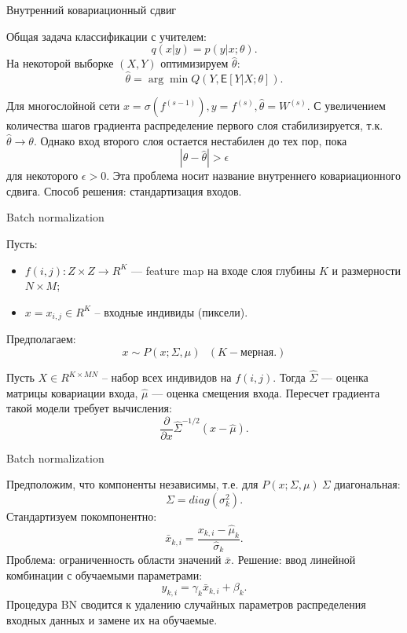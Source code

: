 \documentclass[11pt, intlimits]{beamer}
\newcommand{\Expect}{\mathsf{E}}
\begin{document}
\begin{frame}{Внутренний ковариационный сдвиг}

Общая задача классификации с учителем:
$$
q(x|y)=p(y|x; \theta).
$$
На некоторой выборке $(X, Y)$ оптимизируем $\hat{\theta}$:
$$
\hat{\theta}=\arg \min Q(Y, \Expect[Y|X; \theta]).
$$

Для многослойной сети $x=\sigma(f^{(s-1)}), y=f^{(s)}, \hat{\theta}=W^{(s)}$. С увеличением количества шагов градиента распределение первого слоя стабилизируется, т.к. $\hat{\theta} \to \theta$. Однако вход второго слоя остается нестабилен до тех пор, пока 
$$
|\theta - \hat{\theta}|>\epsilon
$$
для некоторого $\epsilon > 0$. Эта проблема носит название внутреннего ковариационного сдвига. Способ решения: стандартизация входов.

\end{frame}

\begin{frame}{Batch normalization}

Пусть:
\begin{itemize}
\item $f(i,j) : Z \times Z \to R^K$ --- feature map на входе слоя глубины $K$ и размерности $N \times M$;
\item $x=x_{i,j} \in R^{K}$ -- входные индивиды (пиксели).
\end{itemize}

Предполагаем:
$$
x \sim P(x; \Sigma, \mu) \ \ \ (K-\text{мерная.})
$$

Пусть $X \in R^{K \times MN}$ -- набор всех индивидов на $f(i, j)$. Тогда $\hat{\Sigma}$ --- оценка матрицы ковариации входа, $\hat{\mu}$ --- оценка смещения входа. Пересчет градиента такой модели требует вычисления:
$$
\frac{\partial}{\partial x} \hat{\Sigma}^{-1/2}(x-\hat{\mu}).
$$

\end{frame}

\begin{frame}{Batch normalization}

Предположим, что компоненты независимы, т.е. для $P(x; \Sigma, \mu) \ \Sigma$ диагональная:
$$
\Sigma=diag(\sigma_k^2).
$$
Стандартизуем покомпонентно:
$$
\bar{x}_{k, i} = \frac{x_{k, i} - \hat{\mu}_k}{\hat{\sigma}_k}.
$$
Проблема: ограниченность области значений $\bar{x}$. Решение: ввод линейной комбинации с обучаемыми параметрами:
$$
y_{k,i}=\gamma_k \bar{x}_{k,i} + \beta_k.
$$
Процедура BN сводится к удалению случайных параметров распределения входных данных и замене их на обучаемые.

\end{frame}
\end{document}
